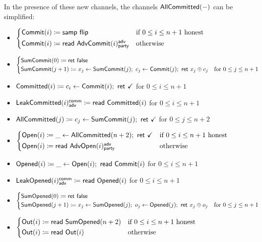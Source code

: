 \noindent In the presence of these new channels, the channels $\mathsf{AllCommitted}(-)$ can be simplified:

\begin{itemize}
\item {\color{blue} $\begin{cases*} \Commit(i) \coloneqq \samp{\flip} & \text{if $0 \leq i \leq n+1$ honest} \\ \Commit(i) \coloneqq \read{\AdvCommit(i)^\adv_\party} & \text{otherwise} \end{cases*}$}
\item {\color{blue} $\begin{cases*} \SumCommit(0) \coloneqq \ret{\false} & \\ \SumCommit(j+1) \coloneqq x_j \leftarrow \SumCommit(j); \ c_j \leftarrow \Commit(j); \ \ret{x_j \oplus c_j} & \text{for $0 \leq j \leq n+1$} \end{cases*}$}
\item {\color{magenta} $\mathsf{Committed}(i) \coloneqq c_i \leftarrow \mathsf{Commit}(i); \ \mathsf{ret} \ \checkmark$ for $0 \leq i \leq n+1$}
\item {\color{magenta} $\mathsf{LeakCommitted}(i)^{\mathsf{comm}}_{\mathsf{adv}} \coloneqq \mathsf{read} \ \mathsf{Committed}(i)$ for $0 \leq i \leq n+1$}
\item {\color{magenta} $\mathsf{AllCommitted}(j) \coloneqq c_j \leftarrow \mathsf{SumCommit}(j); \ \mathsf{ret} \ \checkmark$ for $0 \leq j \leq n+2$}
\item {\color{teal} $\begin{cases*} \Open(i) \coloneqq \_ \leftarrow \AllCommitted(n+2); \ \ret{\checkmark} & \text{if $0 \leq i \leq n+1$ honest} \\ \Open(i) \coloneqq \read{\AdvOpen(i)^\adv_\party} & \text{otherwise} \end{cases*}$}
\item {\color{red} $\mathsf{Opened}(i) \coloneqq \_ \leftarrow \mathsf{Open}(i); \ \mathsf{read} \ \mathsf{Commit}(i)$ for $0 \leq i \leq n+1$}
\item {\color{red} $\mathsf{LeakOpened}(i)^{\mathsf{comm}}_{\mathsf{adv}} \coloneqq \mathsf{read} \ \mathsf{Opened}(i)$ for $0 \leq i \leq n+1$}
\item {\color{red} $\begin{cases*} \SumOpened(0) \coloneqq \ret{\false} & \\ \SumOpened(j+1) \coloneqq x_j \leftarrow \SumOpened(j); \ o_j \leftarrow \Opened(j); \ \ret{x_j \oplus o_j} & \text{for $0 \leq j \leq n+1$} \end{cases*}$}
\item $\begin{cases*} \Out(i) \coloneqq \read{\SumOpened(n+2)} & \text{if $0 \leq i \leq n+1$ honest} \\ \Out(i) \coloneqq \read{\Out(i)} & \text{otherwise} \end{cases*}$
\end{itemize}

